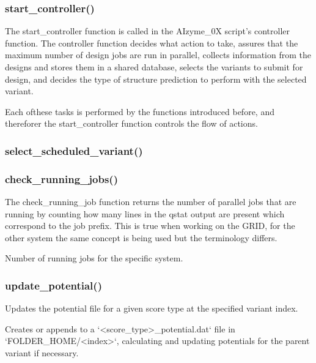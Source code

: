 \documentclass[10pt]{extarticle}
\begin{document}
\subsubsection{start\_controller()}
The start\_controller function is called in the AIzyme\_0X script's controller function.
The controller function decides what action to take,
assures that the maximum number of design jobs are run in parallel,
collects information from the designs and stores them in a shared database,
selects the variants to submit for design,
and decides the type of structure prediction to perform with the selected variant.

Each ofthese tasks is performed by the functions introduced before, and thereforer the start\_controller function controls the flow of actions.
\subsubsection{select\_scheduled\_variant()}
\subsubsection{check\_running\_jobs()}
The check\_running\_job function returns the number of parallel jobs that are running by counting how many lines in the qstat output are present which correspond to the
job prefix. This is true when working on the GRID, for the other system the same concept is being used but the terminology differs.

\par\vspace*{0.5\baselineskip}
{
\begin{description}[noitemsep,topsep=0pt,parsep=0pt,labelwidth=5cm,leftmargin=!,labelindent=0pt,labelsep=0.2cm,itemsep=0pt]
\item[\textcolor{mpgAccentBlue!75!white}{int\dotfill}] Number of running jobs for the specific system.
\end{description}
}
\subsubsection{update\_potential()}
Updates the potential file for a given score type at the specified variant index.

Creates or appends to a `<score\_type>\_potential.dat` file in `FOLDER\_HOME/<index>`, calculating and
updating potentials for the parent variant if necessary.
\end{document}
